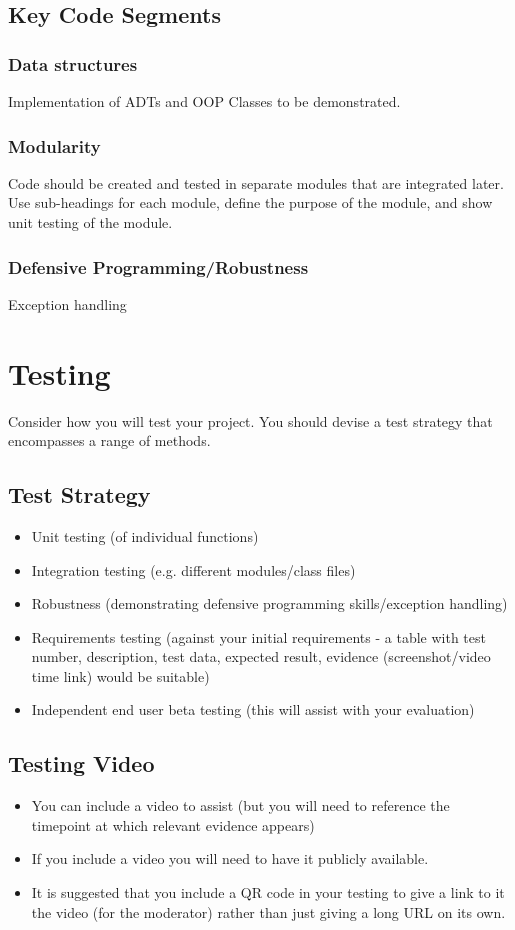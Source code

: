 \documentclass{article}
\begin{document}
\subsection{Key Code Segments}
\subsubsection{Data structures}
Implementation of ADTs and OOP Classes to be demonstrated.

\subsubsection{Modularity}
Code should be created and tested in separate modules that are integrated later. Use sub-headings for each module, define the purpose of the module, and show unit testing of the module.

\subsubsection{Defensive Programming/Robustness}
Exception handling

\section{Testing}
Consider how you will test your project. You should devise a test strategy that encompasses a range of methods.

\subsection{Test Strategy}
\begin{itemize}
    \item Unit testing (of individual functions)
    \item Integration testing (e.g. different modules/class files)
    \item Robustness (demonstrating defensive programming skills/exception handling)
    \item Requirements testing (against your initial requirements - a table with test number, description, test data, expected result, evidence (screenshot/video time link) would be suitable)
    \item Independent end user beta testing (this will assist with your evaluation)
\end{itemize}

\subsection{Testing Video}
\begin{itemize}
    \item You can include a video to assist (but you will need to reference the timepoint at which relevant evidence appears)
    \item If you include a video you will need to have it publicly available.
    \item It is suggested that you include a QR code in your testing to give a link to it the video (for the moderator) rather than just giving a long URL on its own.
\end{itemize}
\end{document}
